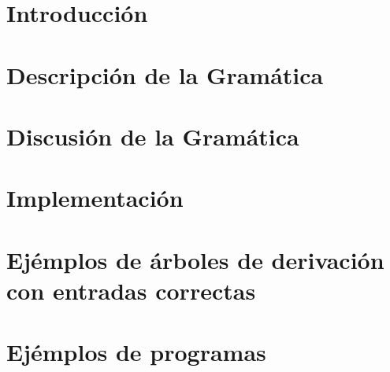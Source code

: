 \documentclass[10pt, a4paper]{article}
\begin{document}
	\maketitle
	\tableofcontents
	
	\newpage
	\section{Introducci\'on}
	
	
	\section{Descripción de la Gramática}
	
	
	\newpage
	\section{Discusión de la Gramática}
	
	
	\newpage
	\section{Implementaci\'on}
	
	
	\newpage
	\section{Ej\'emplos de \'arboles de derivaci\'on con entradas correctas}
	
	
	
	\newpage
	\section{Ej\'emplos de programas}
	
	
	
\end{document}

